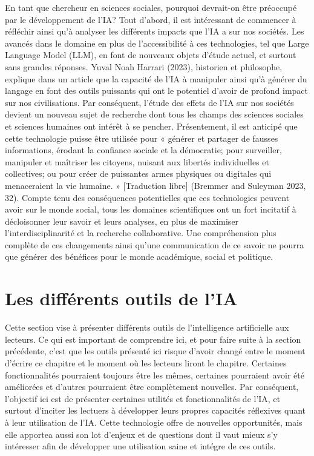 \documentclass[
  letterpaper,
]{scrbook}
\begin{document}
En tant que chercheur en sciences sociales, pourquoi devrait-on être
préoccupé par le développement de l'IA? Tout d'abord, il est intéressant
de commencer à réfléchir ainsi qu'à analyser les différents impacts que
l'IA a sur nos sociétés. Les avancés dans le domaine en plus de
l'accessibilité à ces technologies, tel que Large Language Model (LLM),
en font de nouveaux objets d'étude actuel, et surtout sans grandes
réponses. Yuval Noah Harrari (2023), historien et philosophe, explique
dans un article que la capacité de l'IA à manipuler ainsi qu'à générer
du langage en font des outils puissants qui ont le potentiel d'avoir de
profond impact sur nos civilisations. Par conséquent, l'étude des effets
de l'IA sur nos sociétés devient un nouveau sujet de recherche dont tous
les champs des sciences sociales et sciences humaines ont intérêt à se
pencher. Présentement, il est anticipé que cette technologie puisse être
utilisée pour « générer et partager de fausses informations, érodant la
confiance sociale et la démocratie; pour surveiller, manipuler et
maîtriser les citoyens, nuisant aux libertés individuelles et
collectives; ou pour créer de puissantes armes physiques ou digitales
qui menaceraient la vie humaine. » {[}Traduction libre{]} (Bremmer and
Suleyman 2023, 32). Compte tenu des conséquences potentielles que ces
technologies peuvent avoir sur le monde social, tous les domaines
scientifiques ont un fort incitatif à décloisonner leur savoir et leurs
analyses, en plus de maximiser l'interdisciplinarité et la recherche
collaborative. Une compréhension plus complète de ces changements ainsi
qu'une communication de ce savoir ne pourra que générer des bénéfices
pour le monde académique, social et politique.

\hypertarget{les-diffuxe9rents-outils-de-lia}{%
\section{Les différents outils de
l'IA}\label{les-diffuxe9rents-outils-de-lia}}

Cette section vise à présenter différents outils de l'intelligence
artificielle aux lecteurs. Ce qui est important de comprendre ici, et
pour faire suite à la section précédente, c'est que les outils présenté
ici risque d'avoir changé entre le moment d'écrire ce chapitre et le
moment où les lecteurs liront le chapitre. Certaines fonctionnalités
pourraient toujours être les mêmes, certaines pourraient avoir été
améliorées et d'autres pourraient être complètement nouvelles. Par
conséquent, l'objectif ici est de présenter certaines utilités et
fonctionnalités de l'IA, et surtout d'inciter les lectuers à développer
leurs propres capacités réflexives quant à leur utilisation de l'IA.
Cette technologie offre de nouvelles opportunités, mais elle apportea
aussi son lot d'enjeux et de questions dont il vaut mieux s'y intéresser
afin de développer une utilisation saine et intégre de ces outils.
\end{document}
